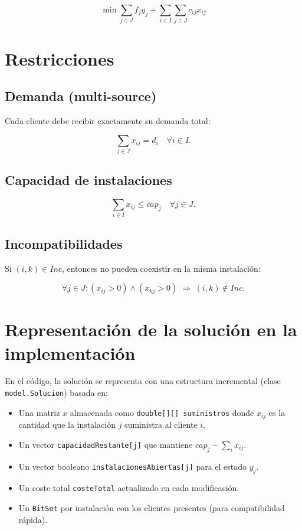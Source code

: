 \documentclass[12pt, a4paper]{report}
\begin{document}
\[
\min \sum_{j\in J} f_j y_j + \sum_{i\in I} \sum_{j\in J} c_{ij} x_{ij}
\]

\section{Restricciones}

\subsection{Demanda (multi-source)}

Cada cliente debe recibir exactamente su demanda total:

\[
\sum_{j\in J} x_{ij} = d_i \quad \forall i\in I.
\]

\subsection{Capacidad de instalaciones}

\[
\sum_{i\in I} x_{ij} \le cap_j \quad \forall j\in J.
\]

\subsection{Incompatibilidades}

Si $ (i,k)\in Inc$, entonces no pueden coexistir en la misma instalación:

\[
\forall j\in J: (x_{ij}>0)\land(x_{kj}>0) \;\Rightarrow\; (i,k)\notin Inc.
\]


\section{Representación de la solución en la implementación}

En el código, la solución se representa con una estructura incremental (clase \texttt{model.Solucion}) basada en:

\begin{itemize}
  \item Una matriz $x$ almacenada como \texttt{double[][] suministros} donde $x_{ij}$ es la cantidad que la instalación $j$ suministra al cliente $i$.
  \item Un vector \texttt{capacidadRestante[j]} que mantiene $cap_j - \sum_i x_{ij}$.
  \item Un vector booleano \texttt{instalacionesAbiertas[j]} para el estado $y_j$.
  \item Un coste total \texttt{costeTotal} actualizado en cada modificación.
  \item Un \texttt{BitSet} por instalación con los clientes presentes (para compatibilidad rápida).
\end{itemize}
\end{document}
